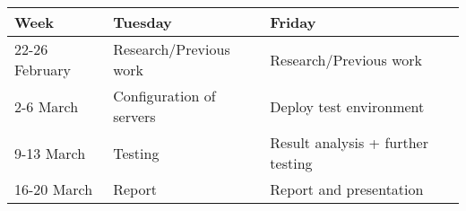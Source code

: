 \begin{center}
  \begin{tabular}{ l | l | l }
    \hline
     \textbf{Week} & \textbf{Tuesday} & \textbf{Friday} \\ \hline
     22-26 February & Research/Previous work & Research/Previous work  \\ \hline
     2-6 March & Configuration of servers & Deploy test environment  \\
    \hline
     9-13 March & Testing & Result analysis + further testing  \\ \hline
     16-20 March & Report & Report and presentation  \\ \hline
  \end{tabular}
\end{center}
